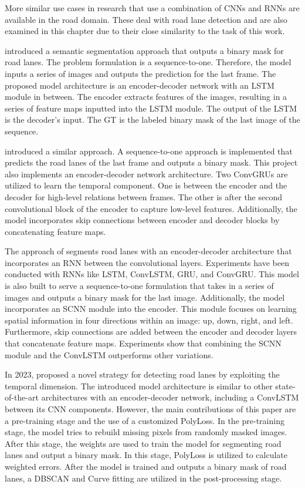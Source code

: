 More similar use cases in research that use a combination of \ac{CNN}s and \ac{RNN}s are available in the road domain.
These deal with road lane detection and are also examined in this chapter due to their close similarity to the task of this work.

\cite{robustLaneDetection2020} introduced a semantic segmentation approach that outputs a binary mask for road lanes.
The problem formulation is a sequence-to-one.
Therefore, the model inputs a series of images and outputs the prediction for the last frame.
The proposed model architecture is an encoder-decoder network with an \ac{LSTM} module in between.
The encoder extracts features of the images, resulting in a series of feature maps inputted into the \ac{LSTM} module.
The output of the \ac{LSTM} is the decoder's input.
The \ac{GT} is the labeled binary mask of the last image of the sequence.

\clearpage

\noindent\cite{CNNGRU2022} introduced a similar approach.
A sequence-to-one approach is implemented that predicts the road lanes of the last frame and outputs a binary mask.
This project also implements an encoder-decoder network architecture.
Two ConvGRUs are utilized to learn the temporal component.
One is between the encoder and the decoder for high-level relations between frames.
The other is after the second convolutional block of the encoder to capture low-level features.
Additionally, the model incorporates skip connections between encoder and decoder blocks by concatenating feature maps.

The approach of \cite{hybridSTLanedetction2023} segments road lanes with an encoder-decoder architecture that incorporates an \ac{RNN} between the convolutional layers.
Experiments have been conducted with \ac{RNN}s like \ac{LSTM}, ConvLSTM, \ac{GRU}, and ConvGRU.
This model is also built to serve a sequence-to-one formulation that takes in a series of images and outputs a binary mask for the last image.
Additionally, the model incorporates an SCNN module into the encoder.
This module focuses on learning spatial information in four directions within an image: up, down, right, and left. Furthermore, skip connections are added between the encoder and decoder layers that concatenate feature maps.
Experiments show that combining the SCNN module and the ConvLSTM outperforms other variations.

In 2023, \cite{robustLaneDetection2023} proposed a novel strategy for detecting road lanes by exploiting the temporal dimension.
The introduced model architecture is similar to other state-of-the-art architectures with an encoder-decoder network, including a ConvLSTM between its \ac{CNN} components.
However, the main contributions of this paper are a pre-training stage and the use of a customized PolyLoss.
In the pre-training stage, the model tries to rebuild missing pixels from randomly masked images.
After this stage, the weights are used to train the model for segmenting road lanes and output a binary mask.
In this stage, PolyLoss is utilized to calculate weighted errors.
After the model is trained and outputs a binary mask of road lanes, a DBSCAN and Curve fitting are utilized in the post-processing stage.

